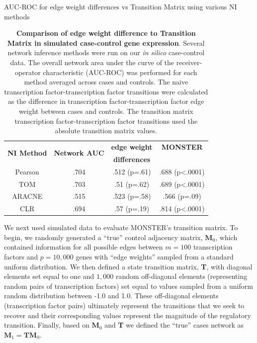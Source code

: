 {\tiny
\begin{table}
AUC-ROC for edge weight differences vs Transition Matrix using various
NI methods\\
\begin{tabular}{|cc||c|c|}
\hline
\multirow{2}{*}{\textbf{NI Method}} & \multirow{2}{*}{\textbf{Network AUC}} & \textbf{edge weight } & \textbf{MONSTER}\tabularnewline
 &  & \textbf{differences} & \tabularnewline
\hline 
Pearson & .704 & .512 (p=.61) & .688 (p<.0001)\tabularnewline
\hline 
TOM & .703 & .51 (p=.62) & .689 (p<.0001)\tabularnewline
\hline 
ARACNE & .515 & .523 (p=.58) & .566 (p=.09)\tabularnewline
\hline 
CLR & .694 & .57 (p=.19) & .814 (p<.0001)\tabularnewline
\hline 
\end{tabular}\caption[Comparison of edge weight difference to Transition Matrix]{\textbf{Comparison of edge weight difference to Transition Matrix in simulated case-control gene expression}. Several network inference methods were run on our \emph{in silico} case-control data. The overall network area under the curve of the receiver-operator characteristic (AUC-ROC) was performed for each method averaged across cases and controls. The naive transcription factor-transcription factor transitions were calculated as the difference in transcription factor-transcription factor edge weight between cases and controls. The transition matrix transcription factor-transcription factor transitions used the absolute transition matrix values. }
\label{tab:tableInSilico}
\end{table}
}

We next used simulated data to evaluate MONSTER's transition matrix. To begin, we randomly generated a ``true'' control adjacency matrix, $\mathbf{M}_{0}$, which contained information for all possible edges between $m=100$ transcription factors and $p=10,000$ genes with ``edge weights'' sampled from a standard uniform distribution. We then defined a state transition matrix, \textbf{T}, with diagonal elements set equal to one and $1,000$ random off-diagonal elements (representing random pairs of transcription factors) set equal to values sampled from a uniform random distribution between -1.0 and 1.0. These off-diagonal elements (transcription factor pairs) ultimately represent the transitions that we seek to recover and their corresponding values represent the magnitude of the regulatory transition. Finally, based on $\mathbf{M}_{0}$ and \textbf{T} we defined the ``true'' cases network as $\mathbf{M}_{1}=\textbf{T} \mathbf{M}_{0}$. 

